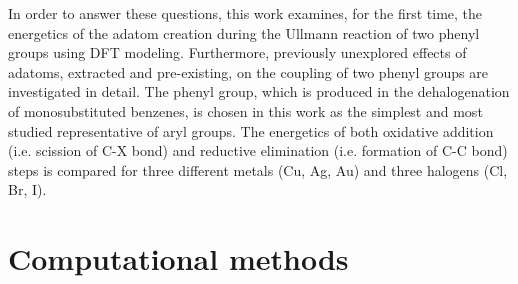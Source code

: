 \documentclass[journal=jacsat,manuscript=article]{achemso}
\newcommand{\lock}{\color{red}}
\newcommand{\lock}{\color{black}}
\begin{document}
{\lock

In order to answer these questions, this work examines, for the first time, the energetics of the adatom creation during the Ullmann reaction of two phenyl groups using DFT modeling. 
Furthermore, previously unexplored effects of adatoms, extracted and pre-existing, on the coupling of two phenyl groups are investigated in detail. 
The phenyl group, which is produced in the dehalogenation of monosubstituted benzenes, is chosen in this work as the simplest and most studied representative of aryl groups. The energetics of both oxidative addition (i.e. scission of C-X bond) and reductive elimination (i.e. formation of C-C bond) steps is compared for three different metals (Cu, Ag, Au) and three halogens (Cl, Br, I).




}

\section{Computational methods}
\end{document}

